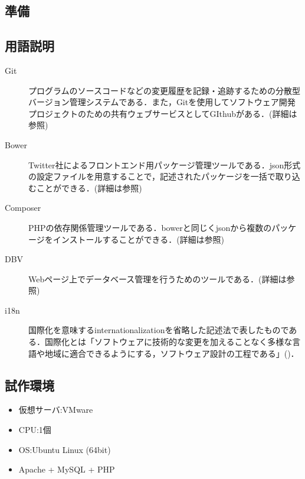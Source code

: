 \documentclass[a4paper]{jarticle}
\begin{document}
\begin{multicols}{2}
\section{準備}

\subsection{用語説明}
\begin{description}
\item[Git]プログラムのソースコードなどの変更履歴を記録・追跡するための分散型バージョン管理システムである．また，Gitを使用してソフトウェア開発プロジェクトのための共有ウェブサービスとしてGIthubがある．(詳細は\cite{git}参照)
\end{description}

\begin{description}
\item[Bower]Twitter社によるフロントエンド用パッケージ管理ツールである．json形式の設定ファイルを用意することで，記述されたパッケージを一括で取り込むことができる．(詳細は\cite{bower}参照)
\end{description}

\begin{description}
\item[Composer] PHPの依存関係管理ツールである．bowerと同じくjsonから複数のパッケージをインストールすることができる．(詳細は\cite{composer}参照)

\end{description}

\begin{description}
\item[DBV]  Webページ上でデータベース管理を行うためのツールである．(詳細は\cite{dbv}参照)
\end{description}

\begin{description}
\item[i18n] 国際化を意味するinternationalizationを省略した記述法で表したものである．国際化とは「ソフトウェアに技術的な変更を加えることなく多様な言語や地域に適合できるようにする，ソフトウェア設計の工程である」(\cite{i18n})．
\end{description}

\subsection{試作環境}
\begin{itemize}
\item 仮想サーバ:VMware
\item CPU:1個
\item OS:Ubuntu Linux (64bit)
\item Apache + MySQL + PHP
\end{itemize}


\end{multicols}
\end{document}
